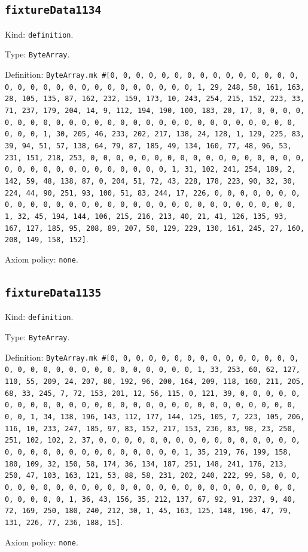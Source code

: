 \documentclass[11pt]{article}
\begin{document}
\subsection*{\texttt{fixtureData1134}}
\noindent Kind: \texttt{definition}.\par
\noindent Type: \texttt{ByteArray}.\par
\noindent Definition: \texttt{ByteArray.mk \#[0, 0, 0, 0, 0, 0, 0, 0, 0, 0, 0, 0, 0, 0, 0, 0, 0, 0, 0, 0, 0, 0, 0, 0, 0, 0, 0, 0, 0, 0, 1, 29, 248, 58, 161, 163, 28, 105, 135, 87, 162, 232, 159, 173, 10, 243, 254, 215, 152, 223, 33, 71, 237, 179, 204, 14, 9, 112, 194, 190, 100, 183, 20, 17, 0, 0, 0, 0, 0, 0, 0, 0, 0, 0, 0, 0, 0, 0, 0, 0, 0, 0, 0, 0, 0, 0, 0, 0, 0, 0, 0, 0, 0, 0, 1, 30, 205, 46, 233, 202, 217, 138, 24, 128, 1, 129, 225, 83, 39, 94, 51, 57, 138, 64, 79, 87, 185, 49, 134, 160, 77, 48, 96, 53, 231, 151, 218, 253, 0, 0, 0, 0, 0, 0, 0, 0, 0, 0, 0, 0, 0, 0, 0, 0, 0, 0, 0, 0, 0, 0, 0, 0, 0, 0, 0, 0, 0, 0, 1, 31, 102, 241, 254, 189, 2, 142, 59, 48, 138, 87, 0, 204, 51, 72, 43, 228, 178, 223, 90, 32, 30, 224, 44, 90, 251, 93, 100, 51, 83, 244, 17, 226, 0, 0, 0, 0, 0, 0, 0, 0, 0, 0, 0, 0, 0, 0, 0, 0, 0, 0, 0, 0, 0, 0, 0, 0, 0, 0, 0, 0, 0, 0, 1, 32, 45, 194, 144, 106, 215, 216, 213, 40, 21, 41, 126, 135, 93, 167, 127, 185, 95, 208, 89, 207, 50, 129, 229, 130, 161, 245, 27, 160, 208, 149, 158, 152]}.\par
\noindent Axiom policy: \texttt{none}.\par
\subsection*{\texttt{fixtureData1135}}
\noindent Kind: \texttt{definition}.\par
\noindent Type: \texttt{ByteArray}.\par
\noindent Definition: \texttt{ByteArray.mk \#[0, 0, 0, 0, 0, 0, 0, 0, 0, 0, 0, 0, 0, 0, 0, 0, 0, 0, 0, 0, 0, 0, 0, 0, 0, 0, 0, 0, 0, 0, 1, 33, 253, 60, 62, 127, 110, 55, 209, 24, 207, 80, 192, 96, 200, 164, 209, 118, 160, 211, 205, 68, 33, 245, 7, 72, 153, 201, 12, 56, 115, 0, 121, 39, 0, 0, 0, 0, 0, 0, 0, 0, 0, 0, 0, 0, 0, 0, 0, 0, 0, 0, 0, 0, 0, 0, 0, 0, 0, 0, 0, 0, 0, 0, 1, 34, 138, 196, 143, 112, 177, 144, 125, 105, 7, 223, 105, 206, 116, 10, 233, 247, 185, 97, 83, 152, 217, 153, 236, 83, 98, 23, 250, 251, 102, 102, 2, 37, 0, 0, 0, 0, 0, 0, 0, 0, 0, 0, 0, 0, 0, 0, 0, 0, 0, 0, 0, 0, 0, 0, 0, 0, 0, 0, 0, 0, 0, 0, 1, 35, 219, 76, 199, 158, 180, 109, 32, 150, 58, 174, 36, 134, 187, 251, 148, 241, 176, 213, 250, 47, 103, 163, 121, 53, 88, 58, 231, 202, 240, 222, 99, 58, 0, 0, 0, 0, 0, 0, 0, 0, 0, 0, 0, 0, 0, 0, 0, 0, 0, 0, 0, 0, 0, 0, 0, 0, 0, 0, 0, 0, 0, 0, 1, 36, 43, 156, 35, 212, 137, 67, 92, 91, 237, 9, 40, 72, 169, 250, 180, 240, 212, 30, 1, 45, 163, 125, 148, 196, 47, 79, 131, 226, 77, 236, 188, 15]}.\par
\noindent Axiom policy: \texttt{none}.\par
\end{document}
